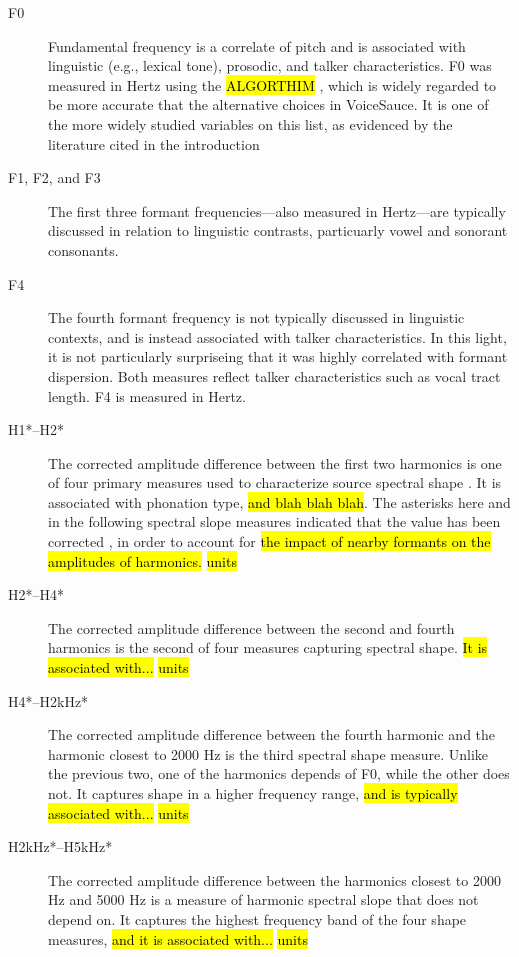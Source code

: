 \begin{description}
    \item[F0] Fundamental frequency is a correlate of pitch and is associated with linguistic (e.g., lexical tone), prosodic, and talker characteristics. F0 was measured in Hertz using the \hl{ALGORTHIM} \citep{}, which is widely regarded to be more accurate that the alternative choices in VoiceSauce. It is one of the more widely studied variables on this list, as evidenced by the literature cited in the introduction \citep[e.g.,][]{}
    \item[F1, F2, and F3] The first three formant frequencies---also measured in Hertz---are typically discussed in relation to linguistic contrasts, particuarly  vowel and sonorant consonants. 
    \item[F4] The fourth formant frequency is not typically discussed in linguistic contexts, and is instead associated with talker characteristics. In this light, it is not particularly surpriseing that it was highly correlated with formant dispersion. Both measures reflect talker characteristics such as vocal tract length. F4 is measured in Hertz.
    \item[H1*--H2*] The corrected amplitude difference between the first two harmonics is one of four primary measures used to characterize source spectral shape \citep{kreiman_2014_theory}. It is associated with phonation type, \hl{and blah blah blah}. The asterisks here and in the following spectral slope measures indicated that the value has been corrected \citep{iseli_2007_voice}, in order to account for \hl{the impact of nearby formants on the amplitudes of harmonics.}  \hl{units} 
    \item[H2*--H4*] The corrected amplitude difference between the second and fourth harmonics is the second of four measures capturing spectral shape. \hl{It is associated with...}  \hl{units}
    \item[H4*--H2kHz*] The corrected amplitude difference between the fourth harmonic and the harmonic closest to 2000 Hz is the third spectral shape measure. Unlike the previous two, one of the harmonics depends of F0, while the other does not. It captures shape in a higher frequency range, \hl{and is typically associated with...}  \hl{units}
    \item[H2kHz*--H5kHz*] The corrected amplitude difference between the harmonics closest to 2000 Hz and 5000 Hz is a measure of harmonic spectral slope that does not depend on. It captures the highest frequency band of the four shape measures, \hl{and it is associated with...}  \hl{units}

\end{description}
